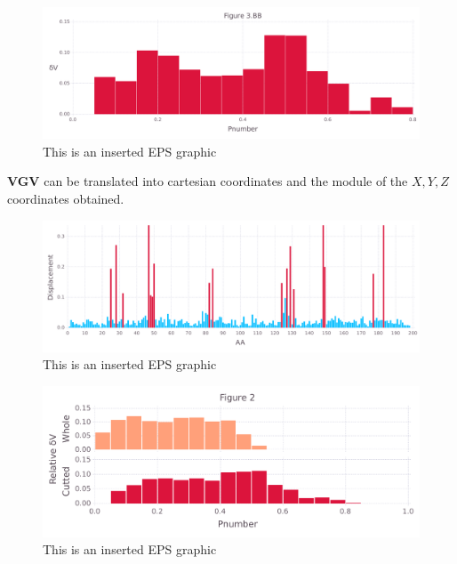 \documentclass[10pt,letterpaper]{article}
\begin{document}
\begin{figure}[ht]
\begin{center}
\includegraphics[scale=0.5]{1hvr_hol/3bbfigure_hi-precision.pdf}
\caption{This is an inserted EPS graphic}
\label{fig11}
\end{center}
\end{figure}

\FloatBarrier


\textbf{VGV} can be translated into cartesian coordinates and the module of the \(X, Y, Z\) coordinates obtained.

\begin{figure}[ht]
\begin{center}
\includegraphics[scale=0.5]{1hvr_hol/5figure_hi-precision.pdf}
\caption{This is an inserted EPS graphic}
\label{fig13}
\end{center}
\end{figure}

\begin{figure}[ht]
\begin{center}
\includegraphics[scale=0.5]{1hvr_hol/3_both_hi-precision.pdf}
\caption{This is an inserted EPS graphic}
\label{fig13}
\end{center}
\end{figure}
\end{document}
